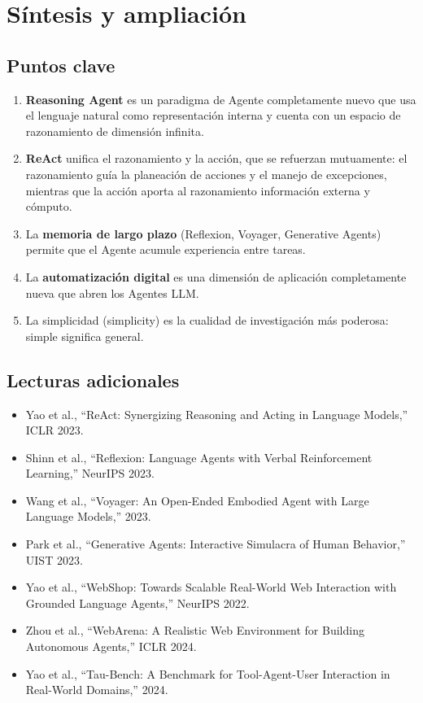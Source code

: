 \section{Síntesis y ampliación}

\subsection{Puntos clave}

\begin{enumerate}
    \item \textbf{Reasoning Agent} es un paradigma de Agente completamente nuevo que usa el lenguaje natural como representación interna y cuenta con un espacio de razonamiento de dimensión infinita.
    \item \textbf{ReAct} unifica el razonamiento y la acción, que se refuerzan mutuamente: el razonamiento guía la planeación de acciones y el manejo de excepciones, mientras que la acción aporta al razonamiento información externa y cómputo.
    \item La \textbf{memoria de largo plazo} (Reflexion, Voyager, Generative Agents) permite que el Agente acumule experiencia entre tareas.
    \item La \textbf{automatización digital} es una dimensión de aplicación completamente nueva que abren los Agentes LLM.
    \item La simplicidad (simplicity) es la cualidad de investigación más poderosa: simple significa general.
\end{enumerate}

\subsection{Lecturas adicionales}

\begin{itemize}
    \item Yao et al., ``ReAct: Synergizing Reasoning and Acting in Language Models,'' ICLR 2023.
    \item Shinn et al., ``Reflexion: Language Agents with Verbal Reinforcement Learning,'' NeurIPS 2023.
    \item Wang et al., ``Voyager: An Open-Ended Embodied Agent with Large Language Models,'' 2023.
    \item Park et al., ``Generative Agents: Interactive Simulacra of Human Behavior,'' UIST 2023.
    \item Yao et al., ``WebShop: Towards Scalable Real-World Web Interaction with Grounded Language Agents,'' NeurIPS 2022.
    \item Zhou et al., ``WebArena: A Realistic Web Environment for Building Autonomous Agents,'' ICLR 2024.
    \item Yao et al., ``Tau-Bench: A Benchmark for Tool-Agent-User Interaction in Real-World Domains,'' 2024.
\end{itemize}



